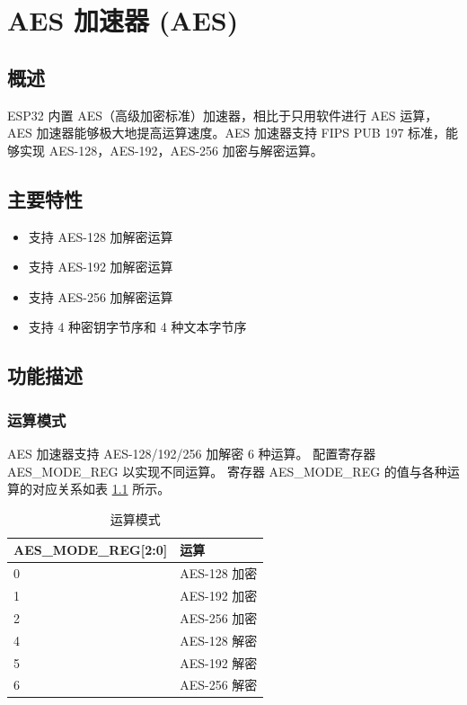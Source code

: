 \documentclass[main\_\_CN.tex]{subfiles}
\begin{document}
\hypertarget{aes}{}
\chapter{AES 加速器 (AES)}
\label{mod:aes}

\section{概述}

ESP32 内置 AES（高级加密标准）加速器，相比于只用软件进行 AES 运算，AES 加速器能够极大地提高运算速度。AES 加速器支持 FIPS PUB 197 标准，能够实现 AES-128，AES-192，AES-256 加密与解密运算。

\section{主要特性}

\begin{itemize}
    \item 支持 AES-128 加解密运算
    \item 支持 AES-192 加解密运算
    \item 支持 AES-256 加解密运算
    \item 支持 4 种密钥字节序和 4 种文本字节序
\end{itemize}


\section{功能描述}


\subsection{运算模式}

AES 加速器支持 AES-128/192/256 加解密 6 种运算。
配置寄存器 AES\_MODE\_REG 以实现不同运算。
寄存器 AES\_MODE\_REG 的值与各种运算的对应关系如表 \ref{table:AESOperation} 所示。

\begin{longtable}[c]{ |p{7cm}|p{8cm}| }
\caption{运算模式}
\label{table:AESOperation}
\\\hline
\rowcolor{lightgray}
AES\_MODE\_REG[2:0]     & 运算\\\hline
    0                       & AES-128 加密    \\
    \hline
    1                       & AES-192 加密    \\
    \hline
    2                       & AES-256 加密    \\
    \hline
    4                       & AES-128 解密    \\
    \hline
    5                       & AES-192 解密    \\
    \hline
    6                       & AES-256 解密    \\
        \hline
\end{longtable}
\end{document}
